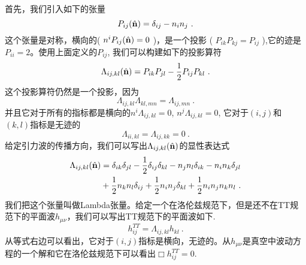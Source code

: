 首先，我们引入如下的张量
\begin{equation}
P_{ij} (\hat{\bf{n}} ) = \delta_{ij} - n_in_j~.
\end{equation}
这个张量是对称，横向的( $ n^iP_{ij}(\hat{\bf{n}}) = 0 $ )，是一个投影 ( $ P_{ik} P_{kj} = P_{ij} $ ),它的迹是$P_{ii} = 2$。使用上面定义的$P_{ij}$, 我们可以构建如下的投影算符
\begin{equation}
\Lambda_{ij,kl} ( \hat{\bf{n}} )  = P_{ik} P_{jl} - \frac{1}{2} P_{ij} P_{kl} ~. 
\end{equation}
这个投影算符仍然是一个投影，因为
\begin{equation}
\Lambda_{ij,kl} \Lambda_{kl,mn} = \Lambda_{ij,mn} ~. 
\end{equation}
并且它对于所有的指标都是横向的$ n^i \Lambda_{ij,kl} = 0 $, $ n^j \Lambda_{ij,kl} = 0 $, 它对于$(i,j)$和$(k,l)$指标是无迹的
\begin{equation}
\Lambda_{ii,kl} = \Lambda_{ij,kk} = 0 ~. 
\end{equation}
给定引力波的传播方向，我们可以写出$\Lambda_{ij,kl} (\hat{ {\bf n} })$的显性表达式
\begin{equation}
\begin{aligned}
\Lambda_{ij,kl} (\hat{ {\bf n} }   ) & = \delta_{ik} \delta_{jl} - \frac{1}{2} \delta_{ij} \delta_{kl} - n_j n_l \delta_{ik} - n_i n_k \delta_{jl} \\
& + \frac{1}{2} n_k n_l \delta_{ij} + \frac{1}{2} n_i n_j \delta_{kl} + \frac{1}{2} n_i n_j n_k n_l ~.
\end{aligned}
\end{equation}
我们把这个张量叫做Lambda张量。给定一个在洛伦兹规范下，但是还不在TT规范下的平面波$h_{\mu\nu}$，我们可以写出TT规范下的平面波如下.
\begin{equation}
h_{ij}^{TT} = \Lambda_{ij,kl} h_{kl} ~.
\end{equation}
从等式右边可以看出，它对于$(i,j)$指标是横向，无迹的。从$h_{\mu\nu}$是真空中波动方程的一个解和它在洛伦兹规范下可以看出$\Box h_{ij}^{TT} = 0$. 


















